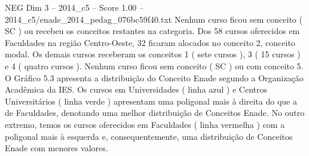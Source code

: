 \begin{textsample}{NEG Dim 3 – 2014\_c5 – Score 1.00 – 2014\_c5/enade\_2014\_pedag\_076bc59f40.txt}
Nenhum curso ficou sem conceito ( SC ) ou recebeu os conceitos restantes na categoria.
Dos 58 cursos oferecidos em Faculdades na região Centro-Oeste, 32 ficaram alocados no conceito 2, conceito modal.
Os demais cursos receberam os conceitos 1 ( sete cursos ), 3 ( 15 cursos ) e 4 ( quatro cursos ).
Nenhum curso ficou sem conceito ( SC ) ou com conceito 5.
O Gráfico 5.3 apresenta a distribuição do Conceito Enade segundo a Organização Acadêmica da IES.
Os cursos em Universidades ( linha azul ) e Centros Universitários ( linha verde ) apresentam uma poligonal mais à direita do que a de Faculdades, denotando uma melhor distribuição de Conceitos Enade.
No outro extremo, temos os cursos oferecidos em Faculdades ( linha vermelha ) com a poligonal mais à esquerda e, consequentemente, uma distribuição de Conceitos Enade com menores valores.

\end{textsample}
